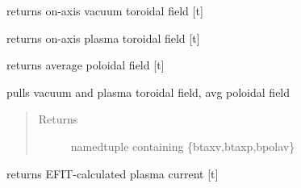 \documentclass[letterpaper,10pt,english]{sphinxmanual}
\begin{document}
\begin{fulllineitems}
\begin{fulllineitems}
\end{fulllineitems}


\begin{fulllineitems}
\label{eqtools:eqtools.EFIT.EFITTree.getBtVac}
returns on-axis vacuum toroidal field {[}t{]}

\end{fulllineitems}


\begin{fulllineitems}
\label{eqtools:eqtools.EFIT.EFITTree.getBtPla}
returns on-axis plasma toroidal field {[}t{]}

\end{fulllineitems}


\begin{fulllineitems}
\label{eqtools:eqtools.EFIT.EFITTree.getBpAvg}
returns average poloidal field {[}t{]}

\end{fulllineitems}


\begin{fulllineitems}
\label{eqtools:eqtools.EFIT.EFITTree.getFields}
pulls vacuum and plasma toroidal field, avg poloidal field
\begin{quote}\begin{description}
\item[{Returns}] \leavevmode
namedtuple containing \{btaxv,btaxp,bpolav\}

\end{description}\end{quote}

\end{fulllineitems}


\begin{fulllineitems}
\label{eqtools:eqtools.EFIT.EFITTree.getIpCalc}
returns EFIT-calculated plasma current {[}t{]}


\end{fulllineitems}
\end{fulllineitems}
\end{document}
